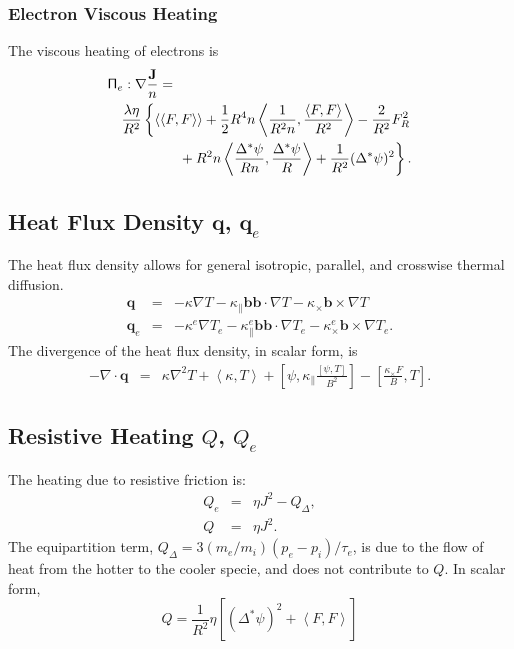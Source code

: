 \documentclass[letterpaper]{book}
\renewcommand{\vec}[1]{\ensuremath{\mathbf{#1}}}
\newcommand{\tensor}[1]{\mathsf{#1}}
\renewcommand{\j}{\vec{J}}
\newcommand{\q}{\vec{q}}
\renewcommand{\P}{\tensor{\Pi}}
\renewcommand{\b}{\vec{b}}
\newcommand{\grad}[1]{\nabla #1}
\renewcommand{\div}[1]{\nabla \cdot #1}
\newcommand{\dotdot}{:}
\newcommand{\gs}[1]{\Delta^* #1}
\newcommand{\lp}[1]{\nabla^2 #1}
\newcommand{\pb}[2]{\left[#1,#2\right]}
\newcommand{\ip}[2]{\left\langle  #1,#2\right\rangle}
\newcommand{\funcss}[2]{
  \left\langle\left\langle #1,#2 \right\rangle\right\rangle}
\begin{document}
\subsubsection{Electron Viscous Heating}

The viscous heating of electrons is
\begin{eqnarray}
  \lefteqn{\P_e \dotdot \grad{\frac{\j}{n}} = }
  \\ & &
  \frac{\lambda \eta}{R^2} \left\{ 
  \funcss{F}{F} 
  + \frac{1}{2} R^4 n \ip{\frac{1}{R^2 n}}{\frac{\ip{F}{F}}{R^2}}
  -\frac{2}{R^2} F_R^2
  \nonumber \right. \\ & & \left. \mbox{}
  + R^2 n \ip{\frac{\gs{\psi}}{R n}}{\frac{\gs{\psi}}{R}}
  + \frac{1}{R^2} (\gs{\psi})^2 \right\}.
\end{eqnarray}


\subsection{Heat Flux Density $\q$, $\q_e$}
\label{sec:heat_flux}

The heat flux density allows for general isotropic, parallel, and
crosswise thermal diffusion.
\begin{eqnarray}
  \label{eq:heat_flux}
  \q & = & -\kappa \grad{T} - \kappa_\parallel \b \b \cdot \grad{T} 
  - \kappa_\times \b \times \grad{T} \\
  \q_e & = & -\kappa^e \grad{T_e} - \kappa_\parallel^e \b \b \cdot \grad{T_e}
  - \kappa_\times^e \b \times \grad{T_e}.
\end{eqnarray}
The divergence of the heat flux density, in scalar form, is
\begin{eqnarray}
  -\div \q & = & \kappa \lp{T} + \ip{\kappa}{T} 
  + \pb{\psi}{\kappa_\parallel \frac{\pb{\psi}{T}}{B^2}}
  - \pb{\frac{\kappa_\times F}{B}}{T}.
\end{eqnarray}

\subsection{Resistive Heating $Q$, $Q_e$}

The heating due to resistive friction is:
\begin{eqnarray*}
  Q_e & = & \eta J^2  - Q_\Delta,\\
  Q   & = & \eta J^2.
\end{eqnarray*}
The equipartition term, $Q_\Delta = 3 (m_e/m_i) (p_e - p_i) / \tau_e$,
is due to the flow of heat from the hotter to the cooler specie, and
does not contribute to $Q$.  In scalar form,
\begin{displaymath}
  Q = \frac{1}{R^2} \eta \left[ (\gs{\psi})^2 + \ip{F}{F} \right]
\end{displaymath}
\end{document}
